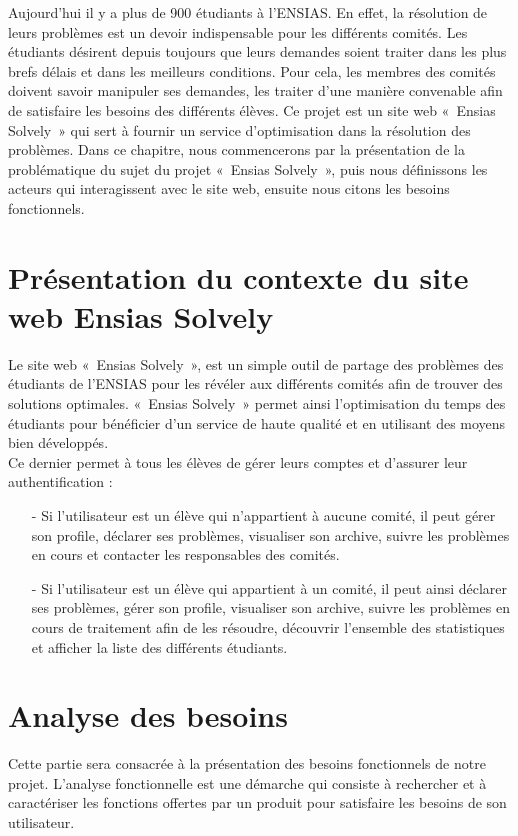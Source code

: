 \documentclass[11.5pt]{report}
\begin{document}
	Aujourd’hui il y a plus de 900 étudiants à l’ENSIAS. En effet, la résolution de leurs problèmes est un devoir indispensable pour les différents comités. Les étudiants désirent depuis toujours que leurs demandes soient traiter dans les plus brefs délais et dans les meilleurs conditions. Pour cela, les membres des comités doivent savoir manipuler ses demandes, les traiter d’une manière convenable afin de satisfaire les besoins des différents élèves.
	Ce projet est un site web « Ensias Solvely » qui sert à fournir un service d’optimisation dans la résolution des problèmes.
	Dans ce chapitre, nous commencerons par la présentation de la problématique du sujet du projet « Ensias Solvely », puis nous définissons les acteurs qui interagissent avec le site web, ensuite nous citons les besoins fonctionnels.


	
\section{Présentation du contexte du site web Ensias Solvely }
Le site web « Ensias Solvely »,  est un simple outil de partage des problèmes des étudiants de l’ENSIAS pour les révéler aux différents comités afin de trouver des solutions optimales. « Ensias Solvely » permet ainsi l’optimisation du temps des étudiants pour bénéficier d’un service de haute qualité et en utilisant des moyens bien développés.\\
Ce dernier permet à tous les élèves de gérer leurs comptes et d’assurer leur authentification : 

\begin{itemize}
 \item [-] Si l’utilisateur est un élève qui n’appartient à aucune comité, il peut gérer son profile, déclarer ses problèmes, visualiser son archive, suivre les problèmes en cours et contacter les responsables des comités. 
 \item [-] Si l’utilisateur est un élève qui appartient à un comité, il peut ainsi déclarer ses problèmes, gérer son profile, visualiser son archive, suivre les problèmes en cours de traitement afin de les résoudre, découvrir l’ensemble des statistiques et afficher la liste des différents étudiants.
 
\end{itemize}

\section{Analyse des besoins}
Cette partie sera consacrée à la présentation des besoins fonctionnels de notre projet.
L’analyse fonctionnelle est une démarche qui consiste à rechercher et à caractériser les fonctions offertes par un produit pour satisfaire les besoins de son utilisateur. 
\end{document}
